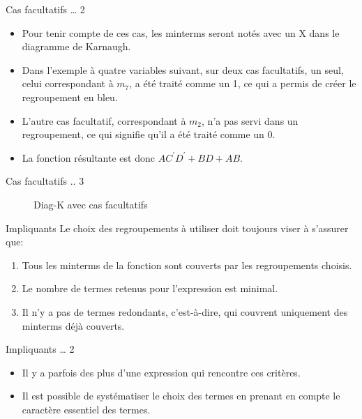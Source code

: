 \documentclass[presentation]{beamer}
\begin{document}
\begin{frame}[label={sec:org1e4c65f}]{Cas facultatifs \ldots{} 2}
\begin{itemize}
\item Pour tenir compte de ces cas, les minterms seront notés avec un X dans le diagramme de Karnaugh.

\item Dans l'exemple à quatre variables suivant, sur deux cas facultatifs, un seul, celui correspondant à \(m_{7}\), a été traité comme un 1, ce qui a permis de créer le regroupement en bleu.

\item L'autre cas facultatif, correspondant à \(m_{2}\), n'a pas servi dans un regroupement, ce qui signifie qu'il a été traité comme un 0.

\item La fonction résultante est donc \(A C^\prime D^\prime + BD + AB\).
\end{itemize}
\end{frame}

\begin{frame}[label={sec:org1656700}]{Cas facultatifs .. 3}
\begin{figure}[htbp]
\centering

\caption{\label{fig:org8121c63}Diag-K avec cas facultatifs}
\end{figure}
\end{frame}


\begin{frame}[label={sec:orgf6294b1}]{Impliquants}
Le choix des regroupements à utiliser doit toujours viser à s'assurer que:
\begin{enumerate}
\item Tous les minterms de la fonction sont couverts par les regroupements choisis.
\item Le nombre de termes retenus pour l'expression est minimal.
\item Il n'y a pas de termes redondants, c'est-à-dire, qui couvrent
uniquement des minterms déjà couverts.
\end{enumerate}
\end{frame}

\begin{frame}[label={sec:orgfe18d65}]{Impliquants \ldots{} 2}
\begin{itemize}
\item Il y a parfois des plus d'une expression qui rencontre ces critères.

\item Il est possible de systématiser le choix des termes en prenant en compte le caractère essentiel des termes.
\end{itemize}
\end{frame}
\end{document}
